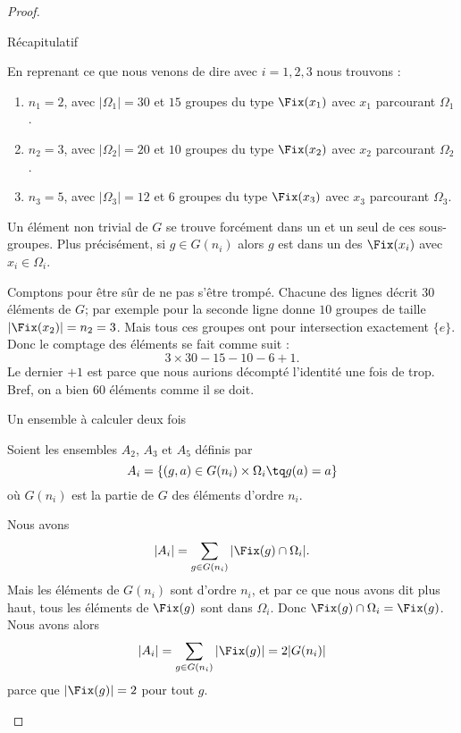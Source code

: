 \begin{proof}
\begin{subproof}
            \item[Récapitulatif]

                En reprenant ce que nous venons de dire avec \( i=1,2,3\) nous trouvons :
                \begin{enumerate}
                    \item
                        \( n_1=2\), avec \( | \Omega_1 |=30\) et \( 15\) groupes du type \( \Fix(x_1)\) avec \( x_1\) parcourant \( \Omega_1\).
                    \item
                        \( n_2=3\), avec \( | \Omega_2 |=20\) et \( 10\) groupes du type \( \Fix(x_2)\) avec \( x_2\) parcourant \( \Omega_2\).
                    \item
                        \( n_3=5\), avec \( | \Omega_3|=12\) et \( 6\) groupes du type \( \Fix(x_3)\) avec \( x_3\) parcourant \( \Omega_3\).
                \end{enumerate}
                Un élément non trivial de \( G\) se trouve forcément dans un et un seul de ces sous-groupes. Plus précisément, si \( g\in G(n_i)\) alors \( g\) est dans un des \( \Fix(x_i)\) avec \( x_i\in \Omega_i\).

                Comptons pour être sûr de ne pas s'être trompé. Chacune des lignes décrit \( 30\) éléments de \( G\); par exemple pour la seconde ligne donne \( 10\) groupes de taille \( | \Fix(x_2) |=n_2=3\). Mais tous ces groupes ont pour intersection exactement \( \{ e \}\). Donc le comptage des éléments se fait comme suit :
                \begin{equation}
                    3\times 30-15-10-6+1.
                \end{equation}
                Le dernier \( +1\) est parce que nous aurions décompté l'identité une fois de trop. Bref, on a bien \( 60\) éléments comme il se doit.

            \item[Un ensemble à calculer deux fois]

                Soient les ensembles \( A_2\), \( A_3\) et \( A_5\) définis par
                \begin{equation}
                    A_i=\{ (g,a)\in G(n_i)\times \Omega_i\tq g(a)=a  \}
                \end{equation}
                où \( G(n_i)\) est la partie de \( G\) des éléments d'ordre \( n_i\).

                Nous avons
                \begin{equation}
                    | A_i |=\sum_{g\in G(n_i)}| \Fix(g)\cap \Omega_i |.
                \end{equation}
                Mais les éléments de \( G(n_i)\) sont d'ordre \( n_i\), et par ce que nous avons dit plus haut, tous les éléments de \( \Fix(g)\) sont dans \( \Omega_i\). Donc \( \Fix(g)\cap \Omega_i=\Fix(g)\). Nous avons alors
                \begin{equation}
                    | A_i |=\sum_{g\in G(n_i)}| \Fix(g) |=2|G(n_i)|
                \end{equation}
                parce que \( | \Fix(g) |=2\) pour tout \( g\).


\end{subproof}
\end{proof}
